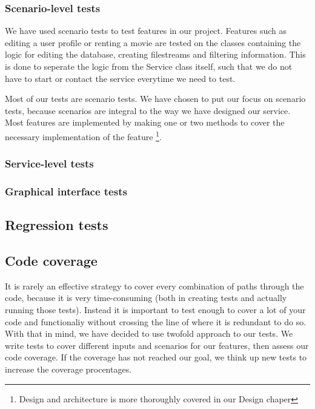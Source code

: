 \subsubsection{Scenario-level tests}
\label{testing_strategy_types_scenario}
We have used scenario tests to test features in our project. Features such as editing a user profile or renting a movie are tested on the classes containing the logic for editing the database, creating filestreams and filtering information. This is done to seperate the logic from the Service class itself, such that we do not have to start or contact the service everytime we need to test.

Most of our tests are scenario tests. We have chosen to put our focus on scenario tests, because scenarios are integral to the way we have designed our service. Most features are implemented by making one or two methods to cover the necessary implementation of the feature \footnote{Design and architecture is more thoroughly covered in our Design chaper}.

\subsubsection{Service-level tests}
\label{testing_strategy_types_service}


\subsubsection{Graphical interface tests}
\label{testing_strategy_types_enduser}


\subsection{Regression tests}
\label{testing_strategy_regression}


\subsection{Code coverage}
\label{testing_strategy_coverage}
It is rarely an effective strategy to cover every combination of paths through the code, because it is very time-consuming (both in creating tests and actually running those tests). Instead it is important to test enough to cover a lot of your code and functionaliy without crossing the line of where it is redundant to do so\cite{The Way of Testivus}. With that in mind, we have decided to use twofold approach to our tests. We write tests to cover different inputs and scenarios for our features, then assess our code coverage. If the coverage has not reached our goal, we think up new tests to increase the coverage procentages.

